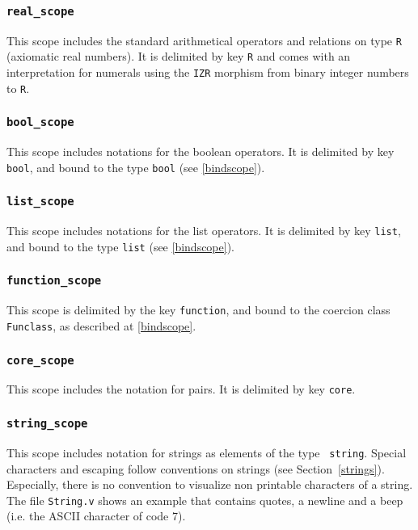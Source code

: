 \subsubsection{\tt real\_scope}

This scope includes the standard arithmetical operators and relations on
type {\tt R} (axiomatic real numbers). It is delimited by key {\tt R}
and comes with an interpretation for numerals using the {\tt IZR}
morphism from binary integer numbers to {\tt R}.

\subsubsection{\tt bool\_scope}

This scope includes notations for the boolean operators. It is
delimited by key {\tt bool}, and bound to the type {\tt bool} (see \ref{bindscope}).

\subsubsection{\tt list\_scope}

This scope includes notations for the list operators. It is
delimited by key {\tt list}, and bound to the type {\tt list} (see \ref{bindscope}).

\subsubsection{\tt function\_scope}

This scope is delimited by the key {\tt function}, and bound to the coercion class {\tt Funclass}, 
as described at \ref{bindscope}.

\subsubsection{\tt core\_scope}

This scope includes the notation for pairs. It is delimited by key {\tt core}.

\subsubsection{\tt string\_scope}

This scope includes notation for strings as elements of the type {\tt
string}.  Special characters and escaping follow {\Coq} conventions
on strings (see Section~\ref{strings}). Especially, there is no
convention to visualize non printable characters of a string.  The
file {\tt String.v} shows an example that contains quotes, a newline
and a beep (i.e. the ASCII character of code 7).

